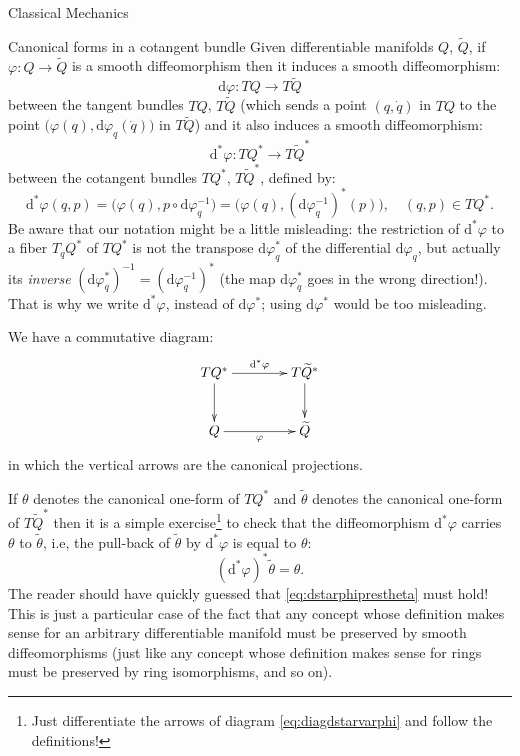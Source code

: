 \documentclass[oneside,a4paper,11pt]{amsbook}
\newcommand{\dd}{\mathrm d}
\theoremstyle{remark}\newtheorem{exercise}{Exercise}[chapter]
\theoremstyle{plain}\newtheorem{teo}{Theorem}[section]
\theoremstyle{plain}\newtheorem{lem}[teo]{Lemma}
\theoremstyle{plain}\newtheorem{prop}[teo]{Proposition}
\theoremstyle{plain}\newtheorem{cor}[teo]{Corollary}
\theoremstyle{definition}\newtheorem{defin}[teo]{Definition}
\theoremstyle{remark}\newtheorem{rem}[teo]{Remark}
\theoremstyle{definition}\newtheorem{notation}[teo]{Notation}
\theoremstyle{definition}\newtheorem{convention}[teo]{Convention}
\theoremstyle{definition}\newtheorem{example}[teo]{Example}
\numberwithin{section}{chapter}
\numberwithin{equation}{section}
\begin{document}
\begin{chapter}{Classical Mechanics}
\begin{section}{Canonical forms in a cotangent bundle}
Given differentiable manifolds $Q$, $\widetilde Q$, if $\varphi:Q\to\widetilde Q$ is a smooth diffeomorphism then it induces a smooth diffeomorphism:
\[\dd\varphi:TQ\longrightarrow T\widetilde Q\]
between the tangent bundles $TQ$, $T\widetilde Q$ (which sends a point $(q,\dot q)$ in $TQ$ to the point
$\big(\varphi(q),\dd\varphi_q(\dot q)\big)$ in $T\widetilde Q$)
and it also induces a smooth diffeomorphism:
\[\dd^*\varphi:TQ^*\longrightarrow T\widetilde Q^*\]
between the cotangent bundles $TQ^*$, $T\widetilde Q^*$, defined by:
\begin{equation}\label{eq:dstarvarphi}
\dd^*\varphi(q,p)=\big(\varphi(q),p\circ\dd\varphi_q^{-1}\big)=\big(\varphi(q),(\dd\varphi_q^{-1})^*(p)\big),\quad(q,p)\in TQ^*.
\end{equation}
Be aware that our notation might be a little misleading: the restriction of $\dd^*\varphi$ to a fiber $T_qQ^*$ of $TQ^*$
is not the transpose $\dd\varphi_q^*$ of the differential $\dd\varphi_q$, but actually its {\em inverse\/}
$(\dd\varphi_q^*)^{-1}=(\dd\varphi_q^{-1})^*$ (the map $\dd\varphi_q^*$
goes in the wrong direction!). That is why we write $\dd^*\varphi$, instead of $\dd\varphi^*$; using $\dd\varphi^*$
would be too misleading.

We have a commutative diagram:
\begin{equation}\label{eq:diagdstarvarphi}
\vcenter{\xymatrix@C+15pt{%
TQ^*\ar[r]^{\dd^*\varphi}\ar[d]&T\widetilde Q^*\ar[d]\\
Q\ar[r]_\varphi&\widetilde Q}}
\end{equation}
in which the vertical arrows are the canonical projections.

If $\theta$ denotes the canonical one-form of $TQ^*$ and $\tilde\theta$ denotes the canonical one-form of $T\widetilde Q^*$ then it is a simple
exercise\footnote{%
Just differentiate the arrows of diagram \eqref{eq:diagdstarvarphi} and follow the definitions!}
to check that the diffeomorphism $\dd^*\varphi$ carries $\theta$ to $\tilde\theta$, i.e, the pull-back of $\tilde\theta$ by $\dd^*\varphi$ is
equal to $\theta$:
\begin{equation}\label{eq:dstarphiprestheta}
(\dd^*\varphi)^*\tilde\theta=\theta.
\end{equation}
The reader should have quickly guessed that \eqref{eq:dstarphiprestheta} must hold! This is just a particular case of the fact that any concept whose definition makes
sense for an arbitrary differentiable manifold must be preserved by smooth diffeomorphisms (just like any concept whose definition makes sense for rings must
be preserved by ring isomorphisms, and so on).


\end{section}
\end{chapter}
\end{document}
